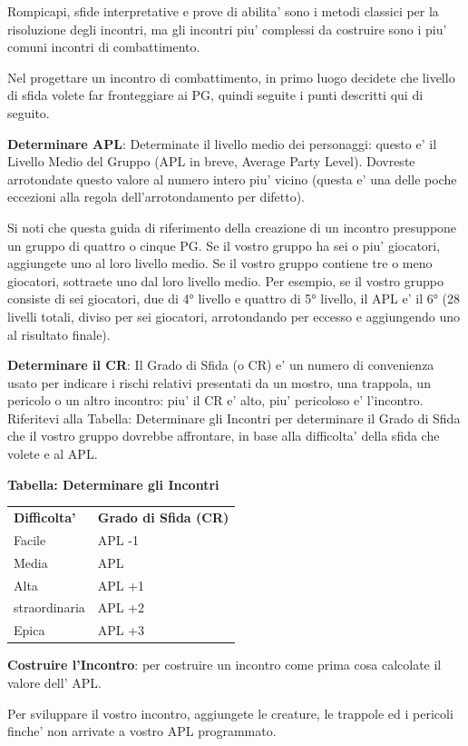 \documentclass[a4paper,11pt,twoside,openany]{book}
\begin{document}
Rompicapi, sfide interpretative e prove di abilita' sono i metodi classici per la risoluzione degli incontri, ma gli incontri piu' complessi da costruire sono i piu' comuni incontri di combattimento.

Nel progettare un incontro di combattimento, in primo luogo decidete che livello di sfida volete far fronteggiare ai PG, quindi seguite i punti descritti qui di seguito.

\textbf{Determinare APL}: Determinate il livello medio dei personaggi: questo e' il Livello Medio del Gruppo (APL in breve, Average Party Level). Dovreste arrotondate questo valore al numero intero piu' vicino (questa e' una delle poche eccezioni alla regola dell'arrotondamento per difetto).

Si noti che questa guida di riferimento della creazione di un incontro presuppone un gruppo di quattro o cinque PG. Se il vostro gruppo ha sei o piu' giocatori, aggiungete uno al loro livello medio. Se il vostro gruppo contiene tre o meno giocatori, sottraete uno dal loro livello medio. Per esempio, se il vostro gruppo consiste di sei giocatori, due di 4° livello e quattro di 5° livello, il APL e' il 6° (28 livelli totali, diviso per sei giocatori, arrotondando per eccesso e aggiungendo uno al risultato finale).

\textbf{Determinare il CR}: Il Grado di Sfida (o CR) e' un numero di convenienza usato per indicare i rischi relativi presentati da un mostro, una trappola, un pericolo o un altro incontro: piu' il CR e' alto, piu' pericoloso e' l'incontro. Riferitevi alla Tabella: Determinare gli Incontri per determinare il Grado di Sfida che il vostro gruppo dovrebbe affrontare, in base alla difficolta' della sfida che volete e al APL.

\bigskip

\textbf{Tabella: Determinare gli Incontri}

\begin{tabular}{ll}
\toprule
\textbf{Difficolta'} & \textbf{Grado di Sfida (CR)}\tabularnewline
Facile & APL -1\tabularnewline
Media & APL\tabularnewline
Alta & APL +1\tabularnewline
straordinaria & APL +2\tabularnewline
Epica & APL +3\tabularnewline
\end{tabular}

\bigskip

\textbf{Costruire l'Incontro}: per costruire un incontro come prima cosa calcolate il valore dell' APL.

Per sviluppare il vostro incontro, aggiungete le creature, le trappole ed i pericoli finche' non arrivate a vostro APL programmato.
\end{document}
